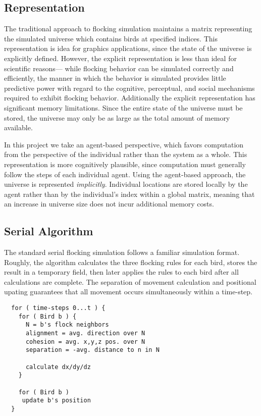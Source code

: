 \subsection*{Representation}
The traditional approach to flocking simulation maintains a matrix
representing the simulated universe which contains birds at specified
indices. This representation is idea for graphics applications, since
the state of the universe is explicitly defined. However, the explicit
representation is less than ideal for scientific reasons--- while
flocking behavior can be simulated correctly and efficiently, the
manner in which the behavior is simulated provides little predictive
power with regard to the cognitive, perceptual, and social mechanisms
required to exhibit flocking behavior. Additionally the explicit
representation has significant memory limitations. Since the entire
state of the universe must be stored, the universe may only be as
large as the total amount of memory available.

In this project we take an agent-based perspective, which favors
computation from the perspective of the individual rather than the
system as a whole. This representation is more cognitively plausible,
since computation must generally follow the steps of each individual
agent. Using the agent-based approach, the universe is represented
\emph{implicitly}. Individual locations are stored locally by the
agent rather than by the individual's index within a global matrix,
meaning that an increase in universe size does not incur additional
memory costs. 

\subsection*{Serial Algorithm}
The standard serial flocking simulation follows a familiar simulation
format. Roughly, the algorithm calculates the three flocking rules for
each bird, stores the result in a temporary field, then later applies
the rules to each bird after all calculations are complete. The
separation of movement calculation and positional upating guarantees
that all movement occurs simultaneously within a time-step.

\newpage
\begin{verbatim}
  for ( time-steps 0...t ) {
    for ( Bird b ) {
      N = b's flock neighbors
      alignment = avg. direction over N
      cohesion = avg. x,y,z pos. over N
      separation = -avg. distance to n in N

      calculate dx/dy/dz
    }

    for ( Bird b )
     update b's position
  }
\end{verbatim}

